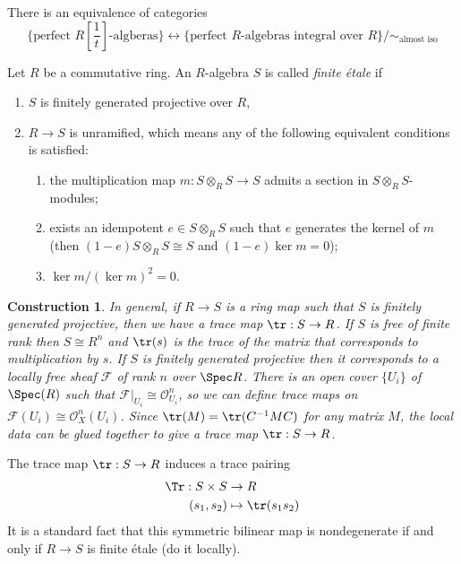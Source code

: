 \documentclass[a4paper]{article}
\newcommand{\sh}[1]{\mathcal{#1}} %
\newtheorem*{construction}{Construction}
\newcommand{\sh}[1]{\mathcal{#1}} %
\begin{document}
\begin{corollary}
  There is an equivalence of categories
  \[
    \{\text{perfect \(R[\frac{1}{t}]\)-algberas}\} \longleftrightarrow
    \{\text{perfect \(R\)-algebras integral over \(R\)}\}/\sim_{\text{almost iso}}
  \]
\end{corollary}

\begin{definition}
  Let \(R\) be a commutative ring. An \(R\)-algebra \(S\) is called \emph{finite étale} if
  \begin{enumerate}
  \item \(S\) is finitely generated projective over \(R\),
  \item \(R \to S\) is unramified, which means any of the following equivalent conditions is satisfied:
    \begin{enumerate}
    \item the multiplication map \(m: S \otimes_R S \to S\) admits a section in \(S \otimes_R S\)-modules;
    \item exists an idempotent \(e \in S \otimes_R S\) such that \(e\) generates the kernel of \(m\) (then \((1 - e) S \otimes_R S \cong S\) and \((1 - e) \ker m = 0\));
    \item \(\ker m/(\ker m)^2 = 0\).
    \end{enumerate}
  \end{enumerate}
\end{definition}

\begin{construction}
  In general, if \(R \to S\) is a ring map such that \(S\) is finitely generated projective, then we have a trace map \(\tr: S \to R\). If \(S\) is free of finite rank then \(S \cong R^n\) and \(\tr(s)\) is the trace of the matrix that corresponds to multiplication by \(s\). If \(S\) is finitely generated projective then it corresponds to a locally free sheaf \(\sh F\) of rank \(n\) over \(\Spec R\). There is an open cover \(\{U_i\}\) of \(\Spec(R)\) such that \(\sh F|_{U_i} \cong \sh O_{U_i}^n\), so we can define trace maps on \(\sh F(U_i) \cong \sh O_X^n(U_i)\). Since \(\tr (M) = \tr (C^{-1}MC)\) for any matrix \(M\), the local data can be glued together to give a trace map \(\tr: S \to R\).
\end{construction}

The trace map \(\tr: S \to R\) induces a trace pairing
\begin{align*}
  \Tr: S \times S &\to R \\
  (s_1, s_2) &\mapsto \tr (s_1 s_2)
\end{align*}
It is a standard fact that this symmetric bilinear map is nondegenerate if and only if \(R \to S\) is finite étale (do it locally).
\end{document}

